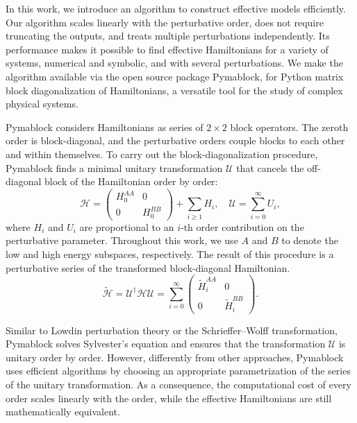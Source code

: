 In this work, we introduce an algorithm to construct effective models
efficiently.
Our algorithm scales linearly with the perturbative order, does not require
truncating the outputs, and treats multiple perturbations independently.
Its performance makes it possible to find effective Hamiltonians for a variety
of systems, numerical and symbolic, and with several perturbations.
We make the algorithm available via the open source package Pymablock, for
Python matrix block diagonalization of Hamiltonians, a versatile tool for
the study of complex physical systems.

Pymablock considers Hamiltonians as series of $2\times 2$ block operators.
The zeroth order is block-diagonal, and the perturbative orders couple
blocks to each other and within themselves.
To carry out the block-diagonalization procedure, Pymablock finds a minimal
unitary transformation $\mathcal{U}$ that cancels the off-diagonal block of the
Hamiltonian order by order:
%
\begin{equation}
\mathcal{H} = \begin{pmatrix}H_0^{AA} & 0 \\ 0 & H_0^{BB}\end{pmatrix} + \sum_{i\geq 1} H_i,\quad
\mathcal{U} = \sum_{i=0}^\infty U_i,
\end{equation}
%
where $H_i$ and $U_i$ are proportional to an $i$-th order
contribution on the perturbative parameter.
Throughout this work, we use $A$ and $B$ to denote the low and high energy
subspaces, respectively.
The result of this procedure is a perturbative series of the transformed
block-diagonal Hamiltonian.
%
\begin{equation}
\label{eq:transformed_hamiltonian}
\tilde{\mathcal{H}} = \mathcal{U}^\dagger \mathcal{H} \mathcal{U}=\sum_{i=0}^{\infty}
\begin{pmatrix}
\tilde{H}_i^{AA} & 0 \\
0 & \tilde{H}_i^{BB}
\end{pmatrix}.
\end{equation}

Similar to Lowdin perturbation theory or the Schrieffer--Wolff transformation,
Pymablock solves Sylvester's equation and ensures that the transformation
$\mathcal{U}$ is unitary order by order.
However, differently from other approaches, Pymablock uses efficient algorithms
by choosing an appropriate parametrization of the series of the unitary
transformation.
As a consequence, the computational cost of every order scales linearly with
the order, while the effective Hamiltonians are still mathematically equivalent.
